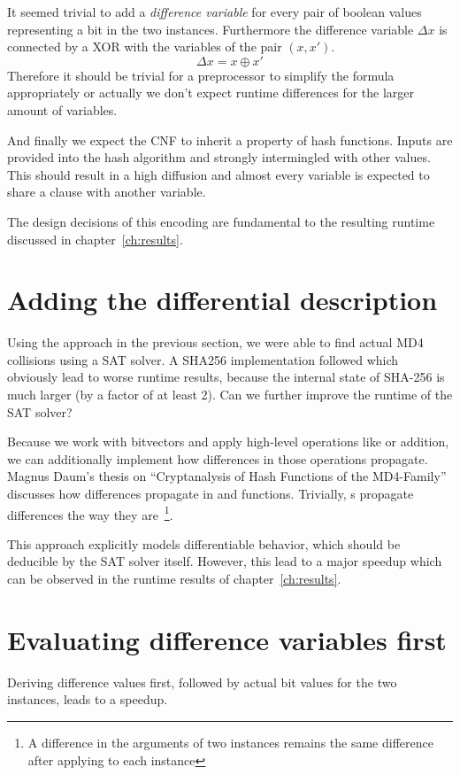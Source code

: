 It seemed trivial to add a \emph{difference variable} for every pair of boolean
values representing a bit in the two instances. Furthermore the difference
variable $\Delta x$ is connected by a XOR with the variables of the pair $(x, x')$.
\[ \Delta x = x \oplus x' \]
Therefore it should be trivial for a preprocessor to simplify the formula
appropriately or actually we don't expect runtime differences for the larger
amount of variables.

And finally we expect the CNF to inherit a property of hash functions.
Inputs are provided into the hash algorithm and strongly intermingled
with other values. This should result in a high diffusion and almost every
variable is expected to share a clause with another variable.

The design decisions of this encoding are fundamental to the
resulting runtime discussed in chapter~\ref{ch:results}.

\section{Adding the differential description}
\label{sec:enc-diff-desc}
%
Using the approach in the previous section, we were able to find actual MD4 collisions
using a SAT solver. A SHA256 implementation followed which obviously lead to worse
runtime results, because the internal state of SHA-256 is much larger (by a factor
of at least 2). Can we further improve the runtime of the SAT solver?

Because we work with bitvectors and apply high-level operations like  or addition,
we can additionally implement how differences in those operations propagate.
Magnus Daum's thesis on \enquote{Cryptanalysis of Hash Functions of the
MD4-Family}~\cite[Table 4.4]{daum2005cryptanalysis} discusses how differences propagate in  and
 functions. Trivially, s propagate differences the way they are~\footnote{
A difference in the arguments of two  instances remains the same difference
after applying  to each instance}.

This approach explicitly models differentiable behavior, which should be deducible
by the SAT solver itself. However, this lead to a major speedup which can be observed
in the runtime results of chapter~\ref{ch:results}.

\section{Evaluating difference variables first}
\label{sec:enc-diff-desc-ocnf}
%
\begin{prop}
  Deriving difference values first, followed by actual bit values for the two instances,
  leads to a speedup.
\end{prop}


